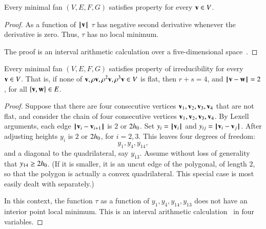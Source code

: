 \begin{lemma}  %
Every minimal fan $(V,E,F,G)$ satisfies property  for every ${\mathbf v}\in V$.
\end{lemma}

\begin{proof}
As a function of ${{\hskip0.1em|\hskip-0.15em|\hskip0.1em}{\mathbf v}{\hskip0.1em|\hskip-0.15em|\hskip0.1em}}$
 $\tau$ has negative second derivative whenever the derivative is zero.  Thus, $\tau$ has no local minimum.

The proof is an interval arithmetic calculation over a five-dimensional space~\cite[cc:d2b]{hales:2009:nonlinear}. %
\end{proof}





\begin{lemma}
Every minimal fan $(V,E,F,G)$ satisfies property  of irreducibility for every ${\mathbf v}\in V$.
That is, if none of ${\mathbf v},\rho {\mathbf v},\rho^2 {\mathbf v},\rho^3 {\mathbf v}\in V$ is flat,
then $r+s=4$, and ${\hskip0.1em|\hskip-0.15em|\hskip0.1em}{\mathbf v} - {\mathbf w}{\hskip0.1em|\hskip-0.15em|\hskip0.1em}= 2$, for all $\{{\mathbf v},{\mathbf w}\}\in E$.
\end{lemma}
%

\begin{proof} 
Suppose that there are four consecutive vertices ${\mathbf v}_1,{\mathbf v}_2,{\mathbf v}_3,{\mathbf v}_4$ that are not flat, and consider the chain of four consecutive vertices ${\mathbf v}_1,{\mathbf v}_2,{\mathbf v}_3,{\mathbf v}_4$. By Lexell arguments, each edge ${\hskip0.1em|\hskip-0.15em|\hskip0.1em}{\mathbf v}_i - {\mathbf v}_{i+1}{\hskip0.1em|\hskip-0.15em|\hskip0.1em}$ is $2$ or $2{h_0}$. Set $y_i = {{\hskip0.1em|\hskip-0.15em|\hskip0.1em}{\mathbf v}_i{\hskip0.1em|\hskip-0.15em|\hskip0.1em}}$ and $y_{ij} = {\hskip0.1em|\hskip-0.15em|\hskip0.1em}{\mathbf v}_i - {\mathbf v}_j{\hskip0.1em|\hskip-0.15em|\hskip0.1em}$. After adjusting heights $y_i$ is $2$ or $2{h_0}$, for $i=2,3$. This leaves four degrees of freedom:
$$
y_1,y_4,y_{14},
$$
and a diagonal to the quadrilateral, say $y_{13}$. Assume without loss of generality that  $y_{14}\ge 2{h_0}$.  (If it is smaller, it is an uncut edge of the polygonal, of length $2$, so that the polygon is actually a convex quadrilateral.  This special case is most easily dealt with separately.)

In this context, the function $\tau$ as a function of $y_1,y_4,y_{14},y_{13}$ does not have an interior point local minimum.
This is an interval arithmetic calculation~\cite[cc:qua]{hales:2009:nonlinear} in four variables.%
\end{proof}


